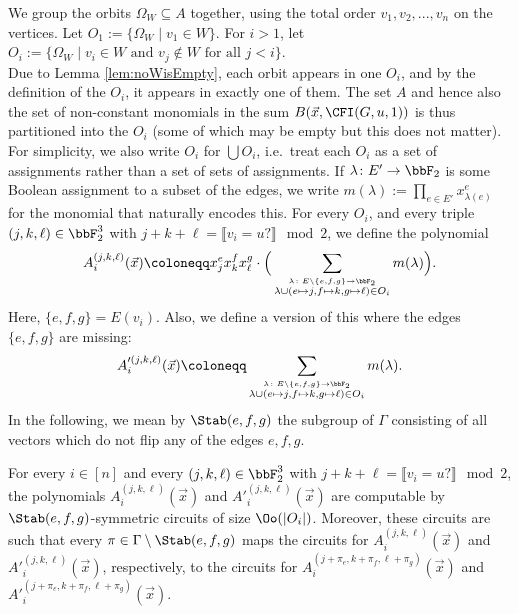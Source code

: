 \documentclass[a4paper,UKenglish,cleveref, autoref, thm-restate]{lipics-v2021}
\begin{document}
We group the orbits $\Omega_W \subseteq A$ together, using the total order $v_1,v_2,...,v_n$ on the vertices. Let $O_1 := \{ \Omega_W \mid v_1 \in W  \}$. For $i > 1$, let $O_i := \{ \Omega_{W} \mid v_i \in W \text{ and } v_j \notin W \text{ for all } j <i   \}$.\\
Due to Lemma \ref{lem:noWisEmpty}, each orbit appears in one $O_i$, and by the definition of the $O_i$, it appears in exactly one of them.
The set $A$ and hence also the set of non-constant monomials in the sum $B(\vec x, \CFI(G,u,1))$ is thus partitioned into the $O_i$ (some of which may be empty but this does not matter). For simplicity, we also write $O_i$ for $\bigcup O_i$, i.e.\ treat each $O_i$ as a set of assignments rather than a set of sets of assignments.
If $\lambda\colon E' \to \bbF_2$ is some Boolean assignment to a subset of the edges, we write $m(\lambda) := \prod_{e \in E'} x^{e}_{\lambda(e)}$ for the monomial that naturally encodes this.
For every $O_i$, and every triple $(j,k,\ell) \in \bbF_2^3$ with $j+k+\ell = \llbracket v_i= u? \rrbracket \mod 2$, we define the polynomial
\[
A^{(j,k,\ell)}_i(\vec x) \coloneqq x^{e}_jx^f_kx^g_\ell \cdot \Big( \sum_{\stackrel{\lambda \colon E \setminus \{e,f,g\} \to \bbF_2}{\lambda \cup (e \mapsto j, f \mapsto k, g \mapsto \ell) \in O_i}} m(\lambda) \Big).       
\] 
Here, $\{e,f,g\} = E(v_i)$. Also, we define a version of this where the edges $\{e,f,g\}$ are missing:
\[
A'^{(j,k,\ell)}_i(\vec x) \coloneqq  \sum_{\stackrel{\lambda \colon E \setminus \{e,f,g\} \to \bbF_2}{\lambda \cup (e \mapsto j, f \mapsto k, g \mapsto \ell) \in O_i}} m(\lambda).       
\] 
In the following, we mean by $\Stab(e,f,g)$ the subgroup of $\Gamma$ consisting of all vectors which do not flip any of the edges $e,f,g$.
\begin{lemma}
	\label{lem:computingA}
	For every $i \in [n]$ and every $(j,k,\ell) \in \bbF_2^3$ with $j+k+\ell = \llbracket v_i= u? \rrbracket \mod 2$, the polynomials $A^{(j,k,\ell)}_i(\vec x)$ and $A'^{(j,k,\ell)}_i(\vec x)$ are computable by $\Stab(e,f,g)$-symmetric circuits of size $\Oo(|O_i|)$. Moreover, these circuits are such that every $\pi \in \Gamma \setminus \Stab(e,f,g)$ maps the circuits for $A^{(j,k,\ell)}_i(\vec x)$ and $A'^{(j,k,\ell)}_i(\vec x)$, respectively, to the circuits for $A^{(j+\pi_e,k+\pi_f,\ell+\pi_g)}_i(\vec x)$ and $A'^{(j+\pi_e,k+\pi_f,\ell+\pi_g)}_i(\vec x)$.
\end{lemma}	
\end{document}
